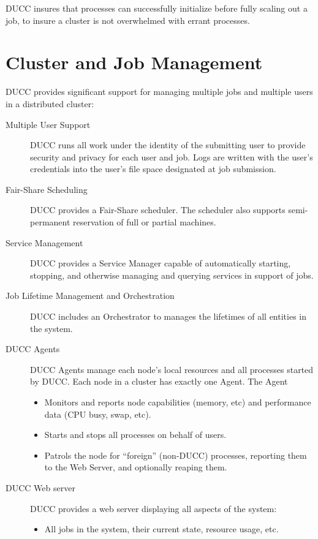     DUCC insures that processes can successfully initialize before fully scaling out a job, to
    insure a cluster is not overwhelmed with errant processes.

    \section{Cluster and Job Management}
    DUCC provides significant support for managing multiple jobs and multiple users in a distributed cluster:

    \begin{description}
        \item[Multiple User Support] DUCC runs all work under the identity of the submitting user to
          provide security and privacy for each user and job. Logs are written with the
          user's credentials into the user's file space designated at job submission.

        \item[Fair-Share Scheduling] DUCC provides a Fair-Share scheduler.  The scheduler also supports
          semi-permanent reservation of full or partial machines.

        \item[Service Management] DUCC provides a Service Manager capable of automatically starting, stopping, and
          otherwise managing and querying services in support of jobs.

        \item[Job Lifetime Management and Orchestration] DUCC includes an Orchestrator to manages the
          lifetimes of all entities in the system.
          
        \item[DUCC Agents] DUCC Agents manage each node's local resources and all
          processes started by DUCC. Each node in a cluster has exactly one Agent. The Agent
          \begin{itemize}
            \item Monitors and reports node capabilities (memory, etc) and performance data (CPU busy,
              swap, etc).
            \item Starts and stops all processes on behalf of users.
            \item Patrols the node for ``foreign'' (non-DUCC) processes, reporting them to the
              Web Server, and optionally reaping them.
          \end{itemize}

        \item[DUCC Web server] DUCC  provides a web server displaying all aspects of the system:
          \begin{itemize}
              \item All jobs in the system, their current state, resource usage, etc.
                

\end{itemize}
\end{description}
